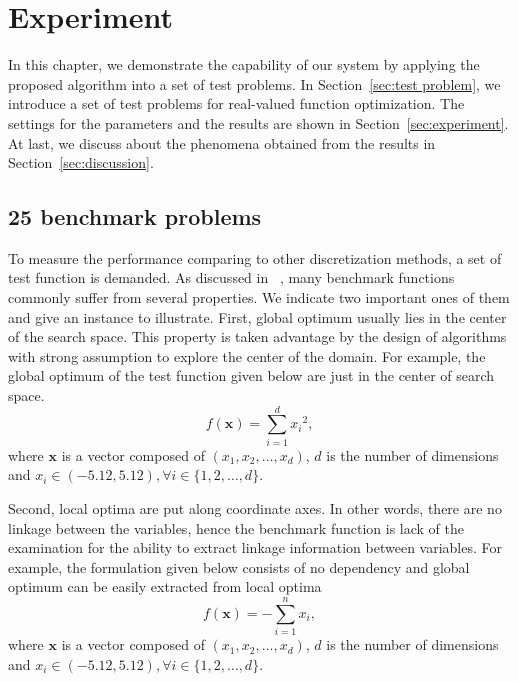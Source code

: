 \chapter{Experiment}
\label{ch:experiment}

In this chapter, we demonstrate the capability of our system by applying
the proposed algorithm into a set of test problems. In Section~\ref{sec:test
problem}, we introduce a set of test problems for real-valued function
optimization. The settings for the parameters and the results are shown
in Section~\ref{sec:experiment}. At last, we discuss about the phenomena
obtained from the results in Section~\ref{sec:discussion}.


\section{25 benchmark problems}
\label{sec:test problem}
To measure the performance comparing to other discretization methods, a set of
test function is demanded. As discussed in~\cite{liang2005novel}%
, many benchmark functions commonly suffer from several properties. We indicate
two important ones of them and give an instance to illustrate. First, global
optimum usually lies in the center of the search space. This property is taken
advantage by the design of algorithms with strong assumption to explore the
center of the domain. For example, the global
optimum of the test function given below are just in the center of search space. 
\[f(\mathbf{x}) = \sum\limits_{i=1}^d{x_i}^2,\]
where $\mathbf{x}$ is a vector composed of $(x_1, x_2,\ldots, x_d)$, $d$ is the
number of dimensions and $x_i \in (-5.12,5.12),\forall i \in \{1,2,\ldots,d\}$.

Second, local optima are
put along coordinate axes. In other words, there are no linkage between the
variables, hence the benchmark function is lack of the examination for  the ability to extract
linkage information between variables. For example, the formulation given below
consists of no dependency and global optimum can be easily extracted from local
optima
\[f(\mathbf{x}) = -\sum\limits_{i=1}^n{x_i},\]
where $\mathbf{x}$ is a vector composed of $(x_1, x_2,\ldots, x_d)$, $d$ is the
number of dimensions and $x_i \in (-5.12,5.12),\forall i \in \{1,2,\ldots,d\}$.

